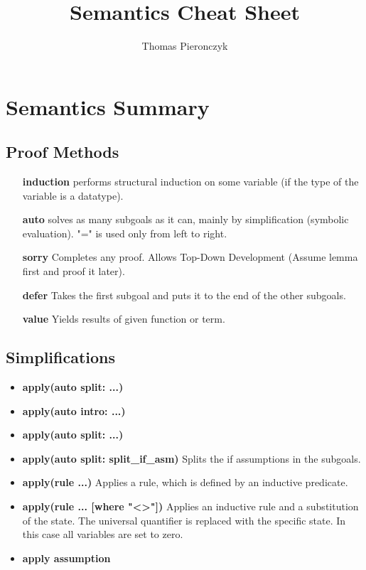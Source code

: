 \documentclass{article}
\title{Semantics Cheat Sheet}
\author{Thomas Pieronczyk}
\begin{document}
\maketitle
\section{Semantics Summary}
\subsection{Proof Methods}
\begin{itemize}
	\item [\textbf{induction}] performs structural induction on some variable (if the type of the variable is a datatype).
	\item [\textbf{auto}] solves as many subgoals as it can, mainly by simplification (symbolic evaluation). "=" is used only from left to right.
	\item [\textbf{sorry}] Completes any proof. Allows Top-Down Development (Assume lemma first and proof it later).
	\item [\textbf{defer}] Takes the first subgoal and puts it to the end of the other subgoals.
	\item [\textbf{value}] Yields results of given function or term.
\end{itemize}

\subsection{Simplifications}

\begin{itemize}
	\item \textbf{apply(auto split: ...)}
	\item \textbf{apply(auto intro: ...)}
	\item \textbf{apply(auto split: ...)}
	\item \textbf{apply(auto split: split\_if\_asm)} Splits the if assumptions in the subgoals.
	\item \textbf{apply(rule ...)} Applies a rule, which is defined by an inductive predicate.
	\item \textbf{apply(rule ... [where "\textless\textgreater"])} Applies an inductive rule and a substitution of the state. The universal quantifier is replaced with the specific state. In this case all variables are set to zero.
	\item \textbf{apply assumption} 
\end{itemize}
\end{document}
